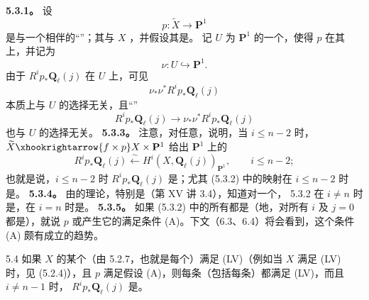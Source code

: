 \textbf{5.3.1。} 设
\[p:\widetilde X\longrightarrow\mathbf P^1\]
是与一个相伴的“”；其与 $X$ ，并假设其是。
记 $U$ 为 $\mathbf P^1$ 的一个，使得 $p$ 在其上，并记为
\begin{equation}\tag{5.3.1.1}\nu:U\hookrightarrow\mathbf P^1.\end{equation}
由于 $R^ip_*\mathbf Q_\ell(j)$ 在 $U$ 上，可见
\[\nu_*\nu^*R^ip_*\mathbf Q_\ell(j)\]
本质上与 $U$ 的选择无关，且“”
\begin{equation}\tag{5.3.2}R^ip_*\mathbf Q_\ell(j)\longrightarrow\nu_*\nu^*R^ip_*\mathbf Q_\ell(j)\end{equation}
也与 $U$ 的选择无关。
\textbf{5.3.3。} 注意，对任意，说明，当 $i\leq n-2$ 时，
$\widetilde X\xhookrightarrow{f\times p}X\times\mathbf P^1$ 给出 $\mathbf P^1$ 上的
\[R^ip_*\mathbf Q_\ell(j)\xleftarrow{\sim}H^i(X,\mathbf Q_\ell(j))_{\mathbf P^1},\qquad i\leq n-2;\]
也就是说，$i\leq n-2$ 时 $R^ip_*\mathbf Q_\ell(j)$ 是；尤其 (5.3.2) 中的映射在 $i\leq n-2$ 时是。
\textbf{5.3.4。} 由的理论，特别是（第 XV 讲 3.4），知道对一个， 5.3.2 在 $i\neq n$ 时是，在 $i=n$ 时是。
\textbf{5.3.5。} 如果 (5.3.2) 中的所有都是（地，对所有 $i$ 及 $j=0$ 都是），就说 $p$ 或产生它的满足条件 (A)。下文（6.3、6.4）将会看到，这个条件 (A) 颇有成立的趋势。
\begin{SGAresult}{}{5.4}
如果 $X$ 的某个（由 5.2.7，也就是每个）满足 (LV)（例如当 $X$ 满足 (LV) 时，见 (5.2.4)），且 $p$ 满足假设 (A)，则每条（包括每条）都满足 (LV)，而且 $i\neq n-1$ 时， $R^ip_*\mathbf Q_\ell(j)$ 是。
\end{SGAresult}
